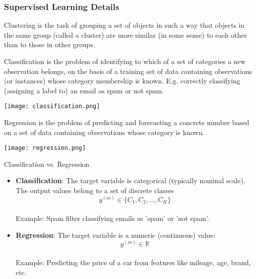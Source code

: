 \subsubsection{Supervised Learning Details}


\begin{definition}{Clustering}
    is the task of grouping a set of objects in such a way that objects in the same group (called a cluster) are more similar (in some sense) to each other than to
    those in other groups.
\end{definition}

\begin{definition}{Classification}
    is the problem of identifying to which of a set of categories a new observation belongs, on the basis of a training set of data containing observations (or instances) whose category membership is known. 
    E.g. correctly classifying (assigning a label to) an email as spam or not spam.

    \texttt{[image: classification.png]}
\end{definition}

\begin{definition}{Regression}
    is the problem of predicting and forecasting a concrete number based on a set of data containing observations whose category is known.

    \texttt{[image: regression.png]}
\end{definition}

\raggedcolumns


\begin{definition}{Classification vs. Regression}
\begin{itemize}
    \item \textbf{Classification}: The target variable is categorical (typically nominal scale). 
    The output values belong to a set of discrete classes $$y^{(m)} \in \{C_1, C_2, \ldots, C_K\}$$ 
    \\ Example: Spam filter classifying emails as 'spam' or 'not spam'.
    \vspace{-2mm}\\
    \item \textbf{Regression}: The target variable is a numeric (continuous) value: $$y^{(m)} \in \mathbb{R}$$
    \\ Example: Predicting the price of a car from features like mileage, age, brand, etc.
\end{itemize}
\end{definition}

